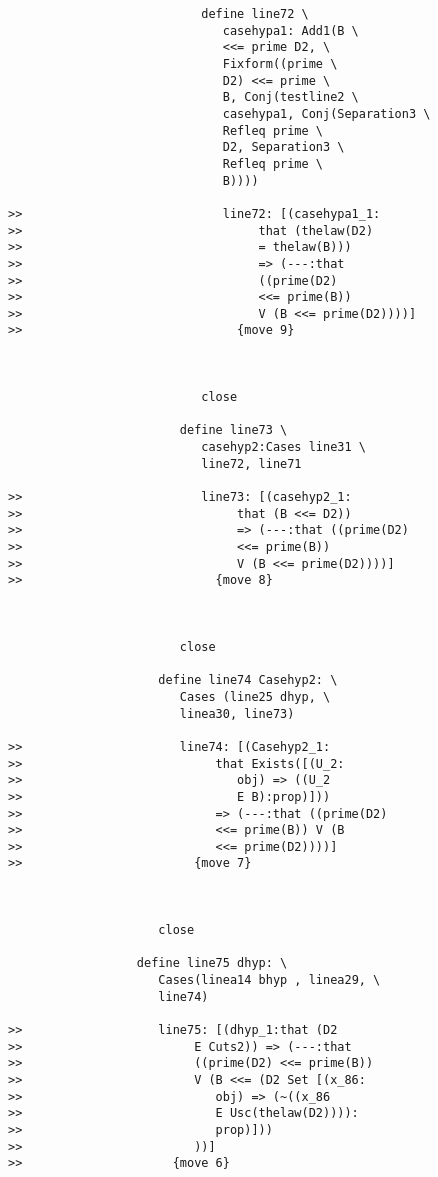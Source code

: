 \documentclass[12pt]{article}
\begin{document}
\begin{verbatim}
                           define line72 \
                              casehypa1: Add1(B \
                              <<= prime D2, \
                              Fixform((prime \
                              D2) <<= prime \
                              B, Conj(testline2 \
                              casehypa1, Conj(Separation3 \
                              Refleq prime \
                              D2, Separation3 \
                              Refleq prime \
                              B))))

>>                            line72: [(casehypa1_1:
>>                                 that (thelaw(D2)
>>                                 = thelaw(B)))
>>                                 => (---:that
>>                                 ((prime(D2)
>>                                 <<= prime(B))
>>                                 V (B <<= prime(D2))))]
>>                              {move 9}



                           close

                        define line73 \
                           casehyp2:Cases line31 \
                           line72, line71

>>                         line73: [(casehyp2_1:
>>                              that (B <<= D2))
>>                              => (---:that ((prime(D2)
>>                              <<= prime(B))
>>                              V (B <<= prime(D2))))]
>>                           {move 8}



                        close

                     define line74 Casehyp2: \
                        Cases (line25 dhyp, \
                        linea30, line73)

>>                      line74: [(Casehyp2_1:
>>                           that Exists([(U_2:
>>                              obj) => ((U_2
>>                              E B):prop)]))
>>                           => (---:that ((prime(D2)
>>                           <<= prime(B)) V (B
>>                           <<= prime(D2))))]
>>                        {move 7}



                     close

                  define line75 dhyp: \
                     Cases(linea14 bhyp , linea29, \
                     line74)

>>                   line75: [(dhyp_1:that (D2
>>                        E Cuts2)) => (---:that
>>                        ((prime(D2) <<= prime(B))
>>                        V (B <<= (D2 Set [(x_86:
>>                           obj) => (~((x_86
>>                           E Usc(thelaw(D2)))):
>>                           prop)]))
>>                        ))]
>>                     {move 6}




\end{verbatim}
\end{document}
